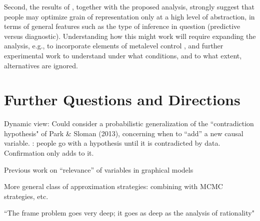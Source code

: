 \documentclass[10pt,letterpaper]{article}
\begin{document}
Second, the results of \cite{Fernbach2011}, together with the proposed analysis, strongly suggest that people may optimize grain of representation only at a high level of abstraction, in terms of general features such as the type of inference in question (predictive versus diagnostic). Understanding how this might work will require expanding the analysis, e.g., to incorporate elements of metalevel control \citep{Icard2014,Lieder2014}, and further experimental work to understand under what conditions, and to what extent, alternatives are ignored.

\section{Further Questions and Directions}


Dynamic view: Could consider a probabilistic generalization of the ``contradiction hypothesis" of Park \& Sloman (2013), concerning when to ``add'' a new causal variable. \cite{KlaymanHa}: people go with a hypothesis until it is contradicted by data. Confirmation only adds to it.

Previous work on ``relevance'' of variables in graphical models \citep{Druzdzel}

More general class of approximation strategies: combining with MCMC strategies, etc. \citep{WickMcCallum}

``The frame problem goes very deep; it goes as deep as the analysis of rationality" \citep{Fodor1987}





\end{document}
